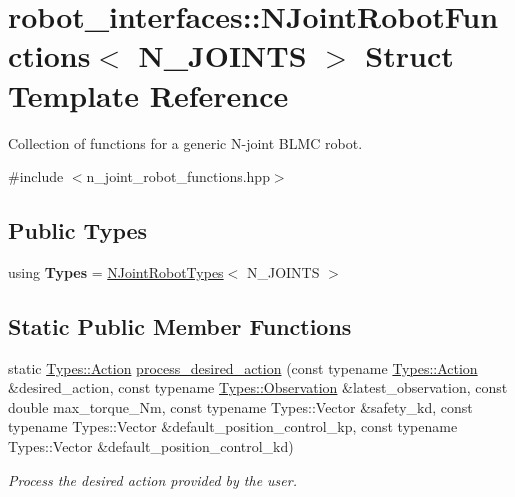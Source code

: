 \hypertarget{structrobot__interfaces_1_1NJointRobotFunctions}{}\section{robot\+\_\+interfaces\+:\+:N\+Joint\+Robot\+Functions$<$ N\+\_\+\+J\+O\+I\+N\+TS $>$ Struct Template Reference}
\label{structrobot__interfaces_1_1NJointRobotFunctions}


Collection of functions for a generic N-\/joint B\+L\+MC robot.  




{\ttfamily \#include $<$n\+\_\+joint\+\_\+robot\+\_\+functions.\+hpp$>$}

\subsection*{Public Types}
\begin{DoxyCompactItemize}
\item 
using {\bfseries Types} = \hyperlink{structrobot__interfaces_1_1NJointRobotTypes}{N\+Joint\+Robot\+Types}$<$ N\+\_\+\+J\+O\+I\+N\+TS $>$\hypertarget{structrobot__interfaces_1_1NJointRobotFunctions_a7ace341ed7d3f1302264384b411c63e8}{}\label{structrobot__interfaces_1_1NJointRobotFunctions_a7ace341ed7d3f1302264384b411c63e8}

\end{DoxyCompactItemize}
\subsection*{Static Public Member Functions}
\begin{DoxyCompactItemize}
\item 
static \hyperlink{structrobot__interfaces_1_1NJointRobotTypes_1_1Action}{Types\+::\+Action} \hyperlink{structrobot__interfaces_1_1NJointRobotFunctions_a25eefa719e07b4499fe3fd6462d866df}{process\+\_\+desired\+\_\+action} (const typename \hyperlink{structrobot__interfaces_1_1NJointRobotTypes_1_1Action}{Types\+::\+Action} \&desired\+\_\+action, const typename \hyperlink{structrobot__interfaces_1_1NJointRobotTypes_1_1Observation}{Types\+::\+Observation} \&latest\+\_\+observation, const double max\+\_\+torque\+\_\+\+Nm, const typename Types\+::\+Vector \&safety\+\_\+kd, const typename Types\+::\+Vector \&default\+\_\+position\+\_\+control\+\_\+kp, const typename Types\+::\+Vector \&default\+\_\+position\+\_\+control\+\_\+kd)
\begin{DoxyCompactList}\small\item\em Process the desired action provided by the user. \end{DoxyCompactList}\end{DoxyCompactItemize}


